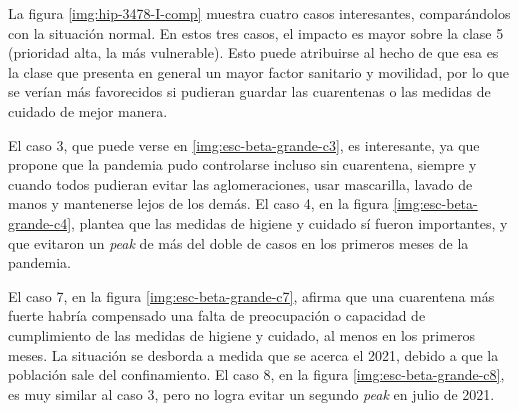 

La figura \ref{img:hip-3478-I-comp} muestra cuatro casos interesantes, comparándolos con la situación normal. En estos tres casos, el impacto es mayor sobre la clase 5 (prioridad alta, la más vulnerable). Esto puede atribuirse al hecho de que esa es la clase que presenta en general un mayor factor sanitario y movilidad, por lo que se verían más favorecidos si pudieran guardar las cuarentenas o las medidas de cuidado de mejor manera.
 
 El caso 3, que puede verse en \ref{img:esc-beta-grande-c3}, es interesante, ya que propone que la pandemia pudo controlarse incluso sin cuarentena, siempre y cuando todos pudieran evitar las aglomeraciones, usar mascarilla, lavado de manos y mantenerse lejos de los demás. El caso 4, en la figura \ref{img:esc-beta-grande-c4}, plantea que las medidas de higiene y cuidado sí fueron importantes, y que evitaron un \textit{peak} de más del doble de casos en los primeros meses de la pandemia. 
 
 
El caso 7, en la figura \ref{img:esc-beta-grande-c7}, afirma que una cuarentena más fuerte habría compensado una falta de preocupación o capacidad de cumplimiento de las medidas de higiene y cuidado, al menos en los primeros meses. La situación se desborda a medida que se acerca el 2021, debido a que la población sale del confinamiento. El caso 8, en la figura \ref{img:esc-beta-grande-c8}, es muy similar al caso 3, pero no logra evitar un segundo \textit{peak} en julio de 2021.


